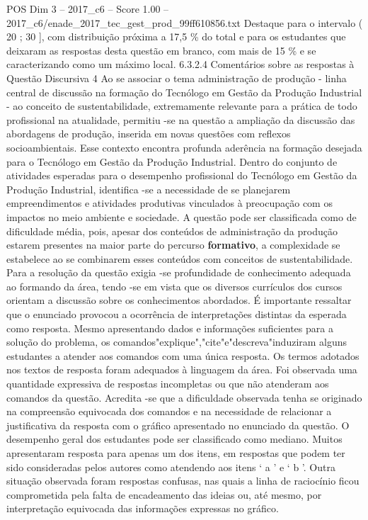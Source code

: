 \begin{textsample}{POS Dim 3 – 2017\_c6 – Score 1.00 – 2017\_c6/enade\_2017\_tec\_gest\_prod\_99ff610856.txt}
Destaque para o intervalo ( 20 ; 30 ], com distribuição próxima a 17,5 \% do total e para os estudantes que deixaram as respostas desta questão em branco, com mais de 15 \% e se caracterizando como um máximo local. 6.3.2.4 Comentários sobre as respostas à Questão Discursiva 4 Ao se associar o tema administração de produção - linha central de discussão na formação do Tecnólogo em Gestão da Produção Industrial - ao conceito de sustentabilidade, extremamente relevante para a prática de todo profissional na atualidade, permitiu -se na questão a ampliação da discussão das abordagens de produção, inserida em novas questões com reflexos socioambientais.
Esse contexto encontra profunda aderência na formação desejada para o Tecnólogo em Gestão da Produção Industrial.
Dentro do conjunto de atividades esperadas para o desempenho profissional do Tecnólogo em Gestão da Produção Industrial, identifica -se a necessidade de se planejarem empreendimentos e atividades produtivas vinculados à preocupação com os impactos no meio ambiente e sociedade.
A questão pode ser classificada como de dificuldade média, pois, apesar dos conteúdos de administração da produção estarem presentes na maior parte do percurso \textbf{formativo}, a complexidade se estabelece ao se combinarem esses conteúdos com conceitos de sustentabilidade.
Para a resolução da questão exigia -se profundidade de conhecimento adequada ao formando da área, tendo -se em vista que os diversos currículos dos cursos orientam a discussão sobre os conhecimentos abordados.
É importante ressaltar que o enunciado provocou a ocorrência de interpretações distintas da esperada como resposta.
Mesmo apresentando dados e informações suficientes para a solução do problema, os comandos"explique","cite"e"descreva"induziram alguns estudantes a atender aos comandos com uma única resposta.
Os termos adotados nos textos de resposta foram adequados à linguagem da área.
Foi observada uma quantidade expressiva de respostas incompletas ou que não atenderam aos comandos da questão.
Acredita -se que a dificuldade observada tenha se originado na compreensão equivocada dos comandos e na necessidade de relacionar a justificativa da resposta com o gráfico apresentado no enunciado da questão.
O desempenho geral dos estudantes pode ser classificado como mediano.
Muitos apresentaram resposta para apenas um dos itens, em respostas que podem ter sido consideradas pelos autores como atendendo aos itens ‘ a ’ e ‘ b ’.
Outra situação observada foram respostas confusas, nas quais a linha de raciocínio ficou comprometida pela falta de encadeamento das ideias ou, até mesmo, por interpretação equivocada das informações expressas no gráfico.

\end{textsample}
